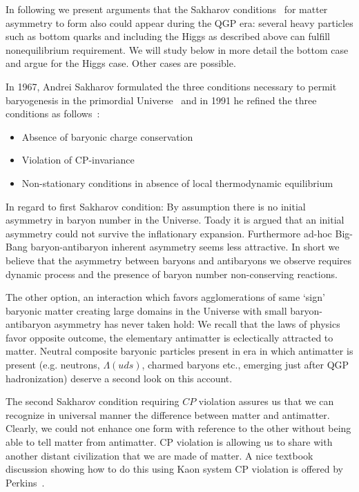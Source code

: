 In following we present arguments that the Sakharov conditions~\cite{Sakharov:1967dj} for matter asymmetry to form also could appear during the QGP era: several heavy particles such as bottom quarks and including the Higgs as described above can fulfill nonequilibrium requirement. We will study below in more detail the bottom case and argue for the Higgs case. Other cases are possible.

In 1967, Andrei Sakharov formulated the three conditions necessary to permit baryogenesis in the primordial Universe~\cite{Sakharov:1967dj} and in 1991 he refined the three conditions as follows~\cite{Sakharov:1988vdp}:
\begin{itemize}
 \item Absence of baryonic charge conservation 
 \item Violation of CP-invariance
 \item Non-stationary conditions in absence of local thermodynamic equilibrium
\end{itemize}
 
In regard to first Sakharov condition: By assumption there is no initial asymmetry in baryon number in the Universe. Toady it is argued that an initial asymmetry could not survive the inflationary expansion. Furthermore ad-hoc Big-Bang baryon-antibaryon inherent asymmetry seems less attractive. In short we believe that the asymmetry between baryons and antibaryons we observe requires dynamic process and the presence of baryon number non-conserving reactions. 

The other option, an interaction which favors agglomerations of same `sign' baryonic matter creating large domains in the Universe with small baryon-antibaryon asymmetry has never taken hold: We recall that the laws of physics favor opposite outcome, the elementary antimatter is eclectically attracted to matter. Neutral composite baryonic particles present in era in which antimatter is present (e.g. neutrons, $\Lambda(uds)$, charmed baryons etc., emerging just after QGP hadronization) deserve a second look on this account.

The second Sakharov condition requiring $CP$ violation assures us that we can recognize in universal manner the difference between matter and antimatter. Clearly, we could not enhance one form with reference to the other without being able to tell matter from antimatter. CP violation is allowing us to share with another distant civilization that we are made of matter. A nice textbook discussion showing how to do this using Kaon system CP violation is offered by Perkins~\cite{Perkins:1982xb}.

